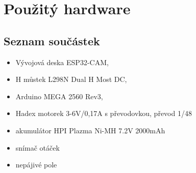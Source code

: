 \documentclass[12pt, a4paper,
oneside,      %
openany
]{report}
\begin{document}
\section{Použitý hardware}
\subsection{Seznam součástek}
\begin{itemize}
    \item Vývojová deska ESP32-CAM,
    \item H můstek L298N Dual H Most DC,
    \item Arduino MEGA 2560 Rev3,
    \item Hadex motorek 3-6V/0,17A s převodovkou, převod 1/48
    \item akumulátor HPI Plazma Ni-MH 7.2V 2000mAh 
    \item snímač otáček
    \item nepájivé pole
\end{itemize}
\end{document}
